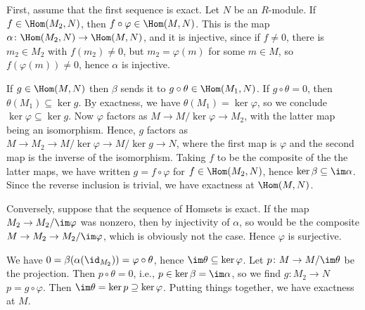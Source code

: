 First, assume that the first sequence is exact.
Let $N$ be an $R$-module. If $ f \in \Hom(M_2, N)$, then
$f \circ \varphi \in \Hom(M, N)$. This is the map $\alpha\colon \Hom(M_2, N)\to \Hom(M, N)$,
and it is injective, since if $f\neq 0$, there is $m_2 \in M_2$ with
$f(m_2)\neq 0$, but $m_2 = \varphi(m)$ for some $m \in M$, so $f(\varphi(m)) \neq 0$,
hence $\alpha$ is injective.

If $g \in \Hom(M, N)$ then $\beta$ sends it to $g \circ \theta \in \Hom(M_1, N)$.
If $g \circ \theta = 0$, then $\theta(M_1) \subseteq \ker g$. By exactness,
we have $\theta(M_1) = \ker\varphi$, so we conclude $\ker\varphi \subseteq \ker g$.
Now $\varphi$ factors as $M \to M/\ker\varphi \to M_2$, with the latter
map being an isomorphism. Hence, $g$ factors as
$M\to M_2 \to M/\ker\varphi \to M/\ker g \to N$, where the first map
is $\varphi$ and the second map is the inverse of the isomorphism.
Taking $f$ to be the composite of the the latter maps, we have
written $g = f \circ \varphi$ for $f \in \Hom(M_2, N)$, hence
$\ker \beta \subseteq \im \alpha$. Since the reverse inclusion is
trivial, we have exactness at $\Hom(M, N)$.

Conversely, suppose that the sequence of Homsets is exact.
If the map $M_2 \to M_2/\im\varphi$ was nonzero, then by
injectivity of $\alpha$, so would be the composite
$M\to M_2\to M_2/\im\varphi$, which is obviously not the case. Hence
 $\varphi$ is surjective.

We have $0 = \beta(\alpha(\id_{M_2})) = \varphi \circ \theta$, hence
$\im\theta \subseteq \ker\varphi$. Let
$p\colon M\to M/\im\theta$ be the projection. Then $p \circ \theta = 0$, i.e.,
$p \in \ker\beta = \im\alpha$, so we find $g\colon M_2\to N$
$p = g \circ \varphi$. Then $\im\theta = \ker p \supseteq \ker\varphi$.
Putting things together, we have exactness at  $M$.
